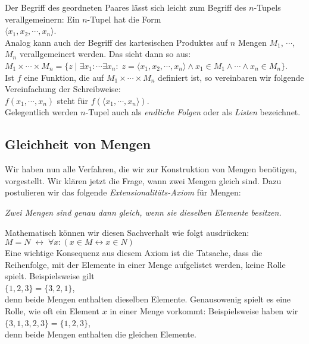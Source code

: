 Der Begriff des geordneten Paares l\"{a}sst sich leicht zum Begriff des $n$-Tupels verallgemeinern:
Ein $n$-Tupel hat die Form \\[0.2cm]
\hspace*{1.3cm} $\langle x_1, x_2, \cdots, x_n \rangle$. \\[0.2cm]
Analog kann auch der Begriff des kartesischen Produktes auf $n$ Mengen $M_1$, $\cdots$, $M_n$
verallgemeinert werden. Das sieht dann so aus: \\[0.2cm]
\hspace*{1.3cm} $M_1 \times \cdots \times M_n =\big\{ z \mid \exists x_1\colon
\cdots \exists x_n \colon \; z = \langle x_1,x_2,\cdots,x_n \rangle \wedge x_1
\in M_1 \wedge \cdots \wedge x_n \in M_n \big\}$. \\[0.2cm]
Ist $f$ eine Funktion, die auf $M_1 \times \cdots \times M_n$ definiert ist,
so vereinbaren wir folgende Vereinfachung der Schreibweise:
\\[0.2cm]
\hspace*{1.3cm} 
$f(x_1, \cdots, x_n)$ \quad steht f\"{u}r \quad $f(\langle x_1, \cdots, x_n\rangle)$. 
\\[0.2cm]
Gelegentlich werden $n$-Tupel auch als \emph{endliche Folgen} oder als
\emph{Listen} bezeichnet.  

\subsection{Gleichheit von Mengen}
Wir haben nun alle Verfahren, die wir zur Konstruktion von Mengen ben\"{o}tigen, vorgestellt.
 Wir kl\"{a}ren jetzt die Frage, wann zwei Mengen gleich sind.  Dazu
postulieren wir das folgende \emph{Extensionalit\"{a}ts-Axiom} f\"{u}r Mengen: 
\begin{center}
 {\sl Zwei Mengen sind genau dann gleich, wenn sie dieselben Elemente besitzen.}
\end{center}
Mathematisch k\"{o}nnen wir diesen Sachverhalt wie folgt ausdr\"{u}cken: \\[0.2cm]
\hspace*{1.3cm} $M = N \;\leftrightarrow\; \forall x: (x \in M \leftrightarrow x \in N)$ \\[0.2cm]
Eine wichtige Konsequenz aus diesem Axiom ist die Tatsache, dass die Reihenfolge, mit der
Elemente in einer Menge aufgelistet werden, keine Rolle spielt.  Beispielsweise gilt \\[0.2cm]
\hspace*{1.3cm} $\{1,2,3\} = \{3,2,1\}$, \\[0.2cm]
denn beide Mengen enthalten dieselben Elemente.  Genausowenig spielt es eine Rolle,
wie oft ein Element $x$ in einer Menge vorkommt:  Beispielsweise haben wir
\\[0.2cm]
\hspace*{1.3cm}
$\{3,1,3,2,3\} = \{1,2,3\}$,
\\[0.2cm]
denn beide Mengen enthalten die gleichen Elemente. 

